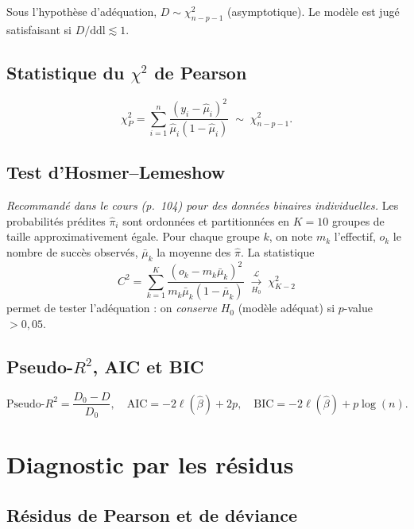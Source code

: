 \documentclass[11pt,a4paper,twoside]{report}
\theoremstyle{definition}
\begin{document}
Sous l'hypothèse d'adéquation, $D \sim \chi^2_{n-p-1}$ (asymptotique).
Le modèle est jugé satisfaisant si $D / \mathrm{ddl} \lesssim 1$.

\subsection{Statistique du $\chi^2$ de Pearson}

\begin{equation}
  \chi^2_P = \sum_{i=1}^n \frac{(y_i - \hat\mu_i)^2}{\hat\mu_i(1-\hat\mu_i)}
  \;\sim\; \chi^2_{n-p-1}.
\end{equation}

\subsection{Test d'Hosmer--Lemeshow}

\emph{Recommandé dans le cours (p.~104) pour des données binaires
individuelles.} Les probabilités prédites $\hat\pi_i$ sont ordonnées et
partitionnées en $K = 10$ groupes de taille approximativement égale.
Pour chaque groupe $k$, on note $m_k$ l'effectif, $o_k$ le nombre de
succès observés, $\bar\mu_k$ la moyenne des $\hat\pi$. La statistique
\begin{equation}
  C^2 = \sum_{k=1}^K \frac{(o_k - m_k\bar\mu_k)^2}{m_k\bar\mu_k(1-\bar\mu_k)}
  \;\xrightarrow[H_0]{\mathcal{L}}\; \chi^2_{K-2}
\end{equation}
permet de tester l'adéquation : on \emph{conserve} $H_0$
(modèle adéquat) si $p$-value $> 0{,}05$.

\subsection{Pseudo-$R^2$, AIC et BIC}

\begin{equation}
  \text{Pseudo-}R^2 = \frac{D_0 - D}{D_0}, \quad
  \mathrm{AIC} = -2\ell(\hat\beta) + 2p, \quad
  \mathrm{BIC} = -2\ell(\hat\beta) + p\log(n).
\end{equation}

\section{Diagnostic par les résidus}

\subsection{Résidus de Pearson et de déviance}
\end{document}
